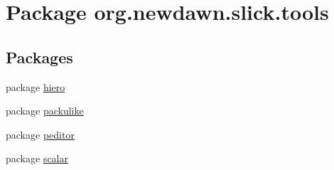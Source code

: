 \hypertarget{namespaceorg_1_1newdawn_1_1slick_1_1tools}{}\section{Package org.\+newdawn.\+slick.\+tools}
\label{namespaceorg_1_1newdawn_1_1slick_1_1tools}
\subsection*{Packages}
\begin{DoxyCompactItemize}
\item 
package \mbox{\hyperlink{namespaceorg_1_1newdawn_1_1slick_1_1tools_1_1hiero}{hiero}}
\item 
package \mbox{\hyperlink{namespaceorg_1_1newdawn_1_1slick_1_1tools_1_1packulike}{packulike}}
\item 
package \mbox{\hyperlink{namespaceorg_1_1newdawn_1_1slick_1_1tools_1_1peditor}{peditor}}
\item 
package \mbox{\hyperlink{namespaceorg_1_1newdawn_1_1slick_1_1tools_1_1scalar}{scalar}}
\end{DoxyCompactItemize}
